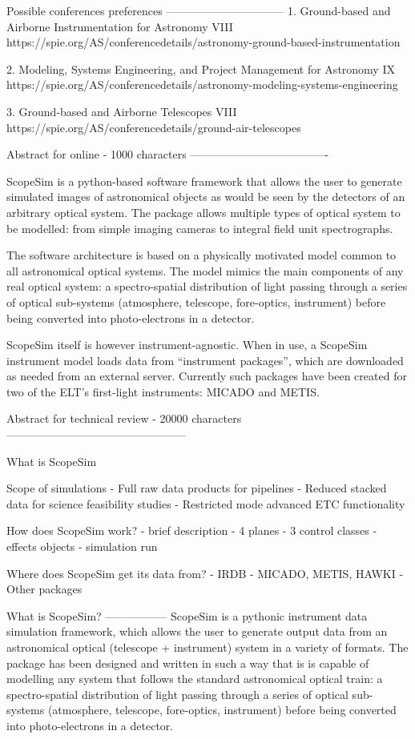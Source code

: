 Possible conferences preferences
--------------------------------
1. Ground-based and Airborne Instrumentation for Astronomy VIII
https://spie.org/AS/conferencedetails/astronomy-ground-based-instrumentation

2. Modeling, Systems Engineering, and Project Management for Astronomy IX
https://spie.org/AS/conferencedetails/astronomy-modeling-systems-engineering

3. Ground-based and Airborne Telescopes VIII
https://spie.org/AS/conferencedetails/ground-air-telescopes

Abstract for online - 1000 characters
-------------------------------------

ScopeSim is a python-based software framework that allows the user to generate
simulated images of astronomical objects as would be seen by the detectors of
an arbitrary optical system. The package allows multiple types of optical system
to be modelled: from simple imaging cameras to integral field unit
spectrographs.

The software architecture is based on a physically motivated model common to all
astronomical optical systems. The model mimics the main components of any real
optical system: a spectro-spatial distribution of light passing through a series
of optical sub-systems (atmosphere, telescope, fore-optics, instrument) before
being converted into photo-electrons in a detector.

ScopeSim itself is however instrument-agnostic. When in use, a ScopeSim
instrument model loads data from ``instrument packages'', which are
downloaded as needed from an external server. Currently such packages have been
created for two of the ELT's first-light instruments: MICADO and METIS.


Abstract for technical review - 20000 characters
------------------------------------------------

What is ScopeSim

Scope of simulations
- Full raw data products for pipelines
- Reduced stacked data for science feasibility studies
- Restricted mode advanced ETC functionality

How does ScopeSim work?
- brief description
- 4 planes
- 3 control classes
- effects objects
- simulation run

Where does ScopeSim get its data from?
- IRDB
- MICADO, METIS, HAWKI
- Other packages


What is ScopeSim?
-----------------
ScopeSim is a pythonic instrument data simulation framework, which allows the
user to generate output data from an astronomical optical (telescope +
instrument) system in a variety of formats. The package has been designed and
written in such a way that is is capable of modelling any system that follows
the standard astronomical optical train: a spectro-spatial distribution of light
passing through a series of optical sub-systems (atmosphere, telescope,
fore-optics, instrument) before being converted into photo-electrons in a
detector.

